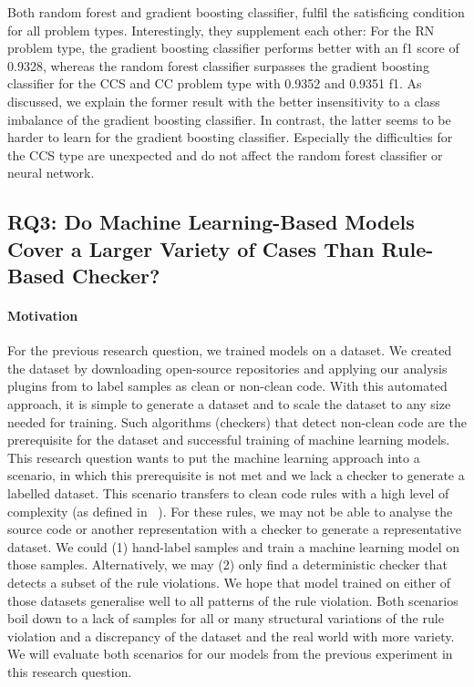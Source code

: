  Both random forest and gradient boosting classifier, fulfil the satisficing condition for all problem types. Interestingly, they supplement each other: For the RN problem type, the gradient boosting classifier performs better with an f1 score of 0.9328, whereas the random forest classifier surpasses the gradient boosting classifier for the CCS and CC problem type with 0.9352 and 0.9351 f1. As discussed, we explain the former result with the better insensitivity to a class imbalance of the gradient boosting classifier. In contrast, the latter seems to be harder to learn for the gradient boosting classifier. Especially the difficulties for the CCS type are unexpected and do not affect the random forest classifier or neural network.

\subsection{RQ3: Do Machine Learning-Based Models Cover a Larger Variety of Cases Than Rule-Based Checker? }\label{rq:3}

\paragraph{Motivation}
For the previous research question, we trained models on a dataset. We created the dataset by downloading open-source repositories and applying our analysis plugins from  to label samples as clean or non-clean code. With this automated approach, it is simple to generate a dataset and to scale the dataset to any size needed for training. Such algorithms (checkers) that detect non-clean code are the prerequisite for the dataset and successful training of machine learning models. This research question wants to put the machine learning approach into a scenario, in which this prerequisite is not met and we lack a checker to generate a labelled dataset. 
This scenario transfers to clean code rules with a high level of complexity (as defined in ~). For these rules, we may not be able to analyse the source code or another representation with a checker to generate a representative dataset. We could (1) hand-label samples and train a machine learning model on those samples. Alternatively, we may (2) only find a deterministic checker that detects a subset of the rule violations. We hope that model trained on either of those datasets generalise well to all patterns of the rule violation. Both scenarios boil down to a lack of samples for all or many structural variations of the rule violation and a discrepancy of the dataset and the real world with more variety. We will evaluate both scenarios for our models from the previous experiment in this research question.


